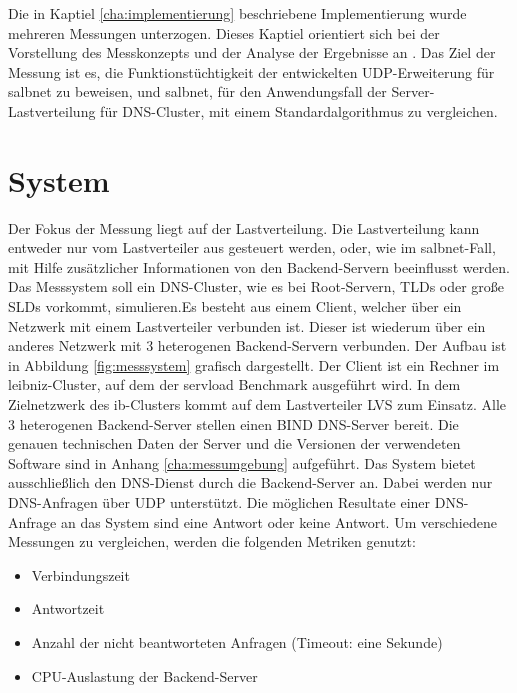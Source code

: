\documentclass[a4paper, 12pt, BCOR10mm, DIV12, toc=bibliography, toc=listof, german]{scrbook}
\begin{document}
		Die in Kaptiel \ref{cha:implementierung} beschriebene Implementierung wurde mehreren Messungen
		unterzogen. Dieses Kaptiel orientiert sich bei der Vorstellung des Messkonzepts und der Analyse
		der Ergebnisse an \cite{jain1991}. Das Ziel der Messung ist es, die Funktionstüchtigkeit der
		entwickelten UDP-Erweiterung für salbnet zu beweisen, und salbnet, für den Anwendungsfall der
		Server-Lastverteilung für DNS-Cluster, mit einem Standardalgorithmus zu vergleichen.

		\section{System} %
		\label{sec:system}

		Der Fokus der Messung liegt auf der Lastverteilung. Die Lastverteilung kann entweder nur vom
		Lastverteiler aus gesteuert werden, oder, wie im salbnet-Fall, mit Hilfe zusätzlicher
		Informationen von den Backend-Servern beeinflusst werden. Das Messsystem soll ein DNS-Cluster,
		wie es bei Root-Servern, TLDs oder große SLDs vorkommt, simulieren.Es besteht aus einem
		Client, welcher über ein Netzwerk mit einem Lastverteiler verbunden ist. Dieser ist wiederum
		über ein anderes Netzwerk mit 3 heterogenen Backend-Servern verbunden. Der Aufbau ist in
		Abbildung \ref{fig:messsystem} grafisch dargestellt. Der Client ist ein Rechner im
		leibniz-Cluster, auf dem der servload Benchmark \cite{menski2012} ausgeführt wird. In dem
		Zielnetzwerk des ib-Clusters kommt auf dem Lastverteiler LVS zum Einsatz. Alle 3 heterogenen
		Backend-Server stellen einen BIND DNS-Server bereit. Die genauen technischen Daten der Server
		und die Versionen der verwendeten Software sind in Anhang \ref{cha:messumgebung} aufgeführt.
		Das System bietet ausschließlich den DNS-Dienst durch die Backend-Server an. Dabei werden nur
		DNS-Anfragen über UDP unterstützt. Die möglichen Resultate einer DNS-Anfrage an das System sind
		eine Antwort oder keine Antwort. Um verschiedene Messungen zu vergleichen, werden die folgenden
		Metriken genutzt:

		\begin{itemize}
			\item Verbindungszeit
			\item Antwortzeit
			\item Anzahl der nicht beantworteten Anfragen (Timeout: eine Sekunde)
			\item CPU-Auslastung der Backend-Server
		\end{itemize}
\end{document}

